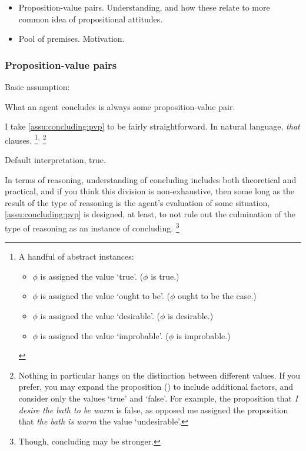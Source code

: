 \begin{note}
  \begin{itemize}
  \item
    Proposition-value pairs.
    Understanding, and how these relate to more common idea of propositional attitudes.
  \item
    Pool of premises.
    Motivation.
  \end{itemize}
\end{note}

\subsubsection{Proposition-value pairs}

\begin{note}
  Basic assumption:

  \begin{assumption}
    \label{assu:concluding:pvp}
    What an agent concludes is always some proposition-value pair.
  \end{assumption}

  I take \autoref{assu:concluding:pvp} to be fairly straightforward.
  In natural language, \emph{that} clauses.%
  \footnote{
    A handful of abstract instances:
    \begin{itemize}[noitemsep]
    \item \(\phi\) is assigned the value `true'. \hfill (\(\phi\) is true.)
    \item \(\phi\) is assigned the value `ought to be'. \hfill (\(\phi\) ought to be the case.)
    \item \(\phi\) is assigned the value `desirable'. \hfill (\(\phi\) is desirable.)
    \item \(\phi\) is assigned the value `improbable'. \hfill (\(\phi\) is improbable.)
    \end{itemize}
  }\(^{,}\)%
  \footnote{
    Nothing in particular hangs on the distinction between different values.
    If you prefer, you may expand the proposition (\world{}) to include additional factors, and consider only the values `true' and `false'.
    For example, the proposition that \emph{I desire the bath to be warm} is false, as opposed me assigned the proposition that \emph{the bath is warm} the value `undesirable'.
  }

  Default interpretation, true.

  In terms of reasoning, understanding of concluding includes both theoretical and practical, and if you think this division is non-exhaustive, then some long as the result of the type of reasoning is the agent's evaluation of some situation, \autoref{assu:concluding:pvp} is designed, at least, to not rule out the culmination of the type of reasoning as an instance of concluding.%
  \footnote{
    Though, concluding may be stronger.
  }
\end{note}


